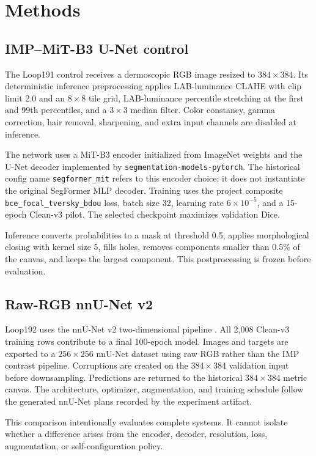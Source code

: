 \section{Methods}

\subsection{IMP--MiT-B3 U-Net control}

The Loop191 control receives a dermoscopic RGB image resized to $384\times384$. Its deterministic inference preprocessing applies LAB-luminance CLAHE with clip limit 2.0 and an $8\times8$ tile grid, LAB-luminance percentile stretching at the first and 99th percentiles, and a $3\times3$ median filter. Color constancy, gamma correction, hair removal, sharpening, and extra input channels are disabled at inference.

The network uses a MiT-B3 encoder initialized from ImageNet weights and the U-Net decoder implemented by \texttt{segmentation-models-pytorch}. The historical config name \texttt{segformer\_mit} refers to this encoder choice; it does not instantiate the original SegFormer MLP decoder. Training uses the project composite \texttt{bce\_focal\_tversky\_bdou} loss, batch size 32, learning rate $6\times10^{-5}$, and a 15-epoch Clean-v3 pilot. The selected checkpoint maximizes validation Dice.

Inference converts probabilities to a mask at threshold 0.5, applies morphological closing with kernel size 5, fills holes, removes components smaller than 0.5\% of the canvas, and keeps the largest component. This postprocessing is frozen before evaluation.

\subsection{Raw-RGB nnU-Net v2}

Loop192 uses the nnU-Net v2 two-dimensional pipeline \citep{nnunet2021}. All 2,008 Clean-v3 training rows contribute to a final 100-epoch model. Images and targets are exported to a $256\times256$ nnU-Net dataset using raw RGB rather than the IMP contrast pipeline. Corruptions are created on the $384\times384$ validation input before downsampling. Predictions are returned to the historical $384\times384$ metric canvas. The architecture, optimizer, augmentation, and training schedule follow the generated nnU-Net plans recorded by the experiment artifact.

This comparison intentionally evaluates complete systems. It cannot isolate whether a difference arises from the encoder, decoder, resolution, loss, augmentation, or self-configuration policy.

